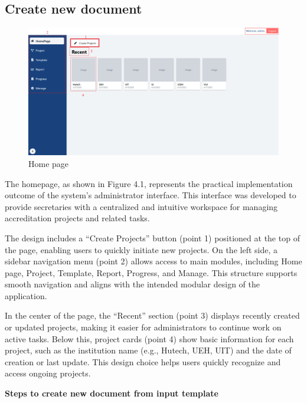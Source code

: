 \subsection{Create new document}

\begin{figure}[h]
\centering
    \includegraphics[width=1.2\textwidth]{images/homepage.png}
    \caption{Home page} 
    \label{fig:home}
\end{figure}
The homepage, as shown in Figure 4.1, represents the practical implementation outcome of the system’s administrator interface. This interface was developed to provide secretaries with a centralized and intuitive workspace for managing accreditation projects and related tasks.

The design includes a “Create Projects” button (point 1) positioned at the top of the page, enabling users to quickly initiate new projects. On the left side, a sidebar navigation menu (point 2) allows access to main modules, including Home page, Project, Template, Report, Progress, and Manage. This structure supports smooth navigation and aligns with the intended modular design of the application.

In the center of the page, the “Recent” section (point 3) displays recently created or updated projects, making it easier for administrators to continue work on active tasks. Below this, project cards (point 4) show basic information for each project, such as the institution name (e.g., Hutech, UEH, UIT) and the date of creation or last update. This design choice helps users quickly recognize and access ongoing projects.

\textbf{Steps to create new document from input template}

